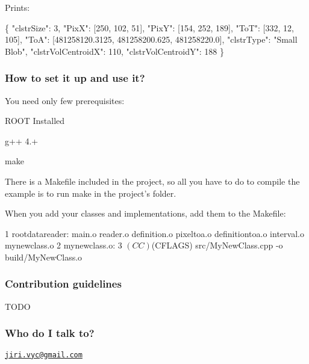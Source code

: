 Prints\+:


\begin{DoxyCode}
\{
    \textcolor{stringliteral}{"clstrSize"}: 3, 
    \textcolor{stringliteral}{"PixX"}: [250, 102, 51], 
    \textcolor{stringliteral}{"PixY"}: [154, 252, 189], 
    \textcolor{stringliteral}{"ToT"}: [332, 12, 105], 
    \textcolor{stringliteral}{"ToA"}: [481258120.3125, 481258200.625, 481258220.0], 
    \textcolor{stringliteral}{"clstrType"}: \textcolor{stringliteral}{"Small Blob"}, 
    \textcolor{stringliteral}{"clstrVolCentroidX"}: 110, 
    \textcolor{stringliteral}{"clstrVolCentroidY"}: 188
\}
\end{DoxyCode}


\subsubsection*{How to set it up and use it?}

You need only few prerequisites\+:


\begin{DoxyItemize}
\item R\+O\+O\+T Installed
\item g++ 4.+
\item make
\end{DoxyItemize}

There is a Makefile included in the project, so all you have to do to compile the example is to run {\ttfamily make} in the project's folder.

When you add your classes and implementations, add them to the Makefile\+:


\begin{DoxyCode}
1 rootdatareader: main.o reader.o definition.o pixeltoa.o definitiontoa.o interval.o mynewclass.o
2 mynewclass.o:
3     $(CC) $(CFLAGS) src/MyNewClass.cpp -o build/MyNewClass.o
\end{DoxyCode}


\subsubsection*{Contribution guidelines}


\begin{DoxyItemize}
\item T\+O\+D\+O
\end{DoxyItemize}

\subsubsection*{Who do I talk to?}

\href{mailto:jiri.vyc@gmail.com}{\tt jiri.\+vyc@gmail.\+com} 